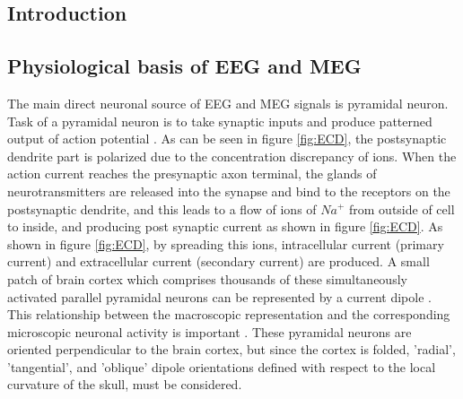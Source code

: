 \subsection{Introduction}

\subsection{Physiological basis of EEG and MEG}
\label{sec:Physiological_basis} 
The main direct neuronal source of EEG and MEG signals is pyramidal neuron.  
Task of a pyramidal neuron is to take synaptic inputs and produce patterned output of action potential \cite{Okada1993}.
As can be seen in figure \ref{fig:ECD}, the postsynaptic dendrite part is polarized due to the concentration discrepancy of ions.
When the action current reaches the presynaptic axon terminal, the glands of neurotransmitters are released into the synapse and bind to the receptors on the postsynaptic dendrite, and this leads to a flow of ions of $Na^+$ from outside of cell to inside, and producing post synaptic current as shown in figure \ref{fig:ECD}.
As shown in figure \ref{fig:ECD}, by spreading this ions, intracellular current (primary current) and extracellular current (secondary current)
 are produced.
A small patch of brain cortex which comprises thousands of these simultaneously activated parallel pyramidal neurons can be represented by a current dipole \cite{Cohen2003}.%
This relationship between the macroscopic representation and the corresponding microscopic neuronal activity is important \cite{Okada1997}.
These pyramidal neurons are oriented perpendicular to the brain cortex, but since the cortex is folded, 'radial', 'tangential', and 'oblique' dipole orientations defined with respect to the local curvature of the skull, must be considered. 
